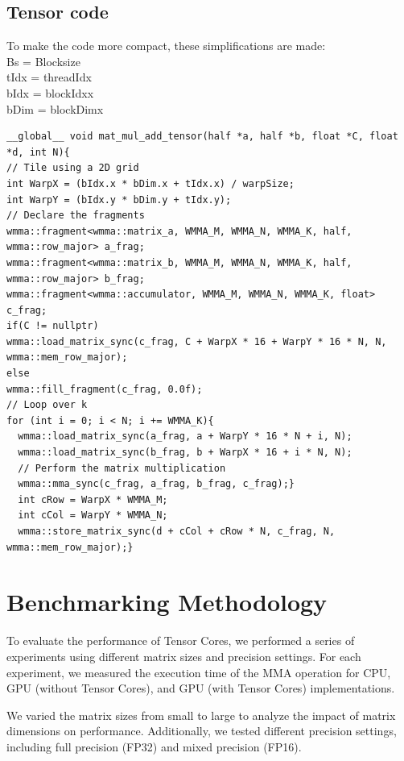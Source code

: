 \documentclass[conference]{IEEEtran}
\begin{document}
  \subsection{Tensor code}\label{sec:TensorCode}
  To make the code more compact, these simplifications are made:\\
  Bs = Blocksize \\
  tIdx = threadIdx \\
  bIdx = blockIdxx \\
  bDim = blockDimx

  \begin{lstlisting}
__global__ void mat_mul_add_tensor(half *a, half *b, float *C, float *d, int N){
// Tile using a 2D grid
int WarpX = (bIdx.x * bDim.x + tIdx.x) / warpSize;
int WarpY = (bIdx.y * bDim.y + tIdx.y);
// Declare the fragments
wmma::fragment<wmma::matrix_a, WMMA_M, WMMA_N, WMMA_K, half, wmma::row_major> a_frag;
wmma::fragment<wmma::matrix_b, WMMA_M, WMMA_N, WMMA_K, half, wmma::row_major> b_frag;
wmma::fragment<wmma::accumulator, WMMA_M, WMMA_N, WMMA_K, float> c_frag;
if(C != nullptr)
wmma::load_matrix_sync(c_frag, C + WarpX * 16 + WarpY * 16 * N, N, wmma::mem_row_major);
else
wmma::fill_fragment(c_frag, 0.0f);
// Loop over k
for (int i = 0; i < N; i += WMMA_K){
  wmma::load_matrix_sync(a_frag, a + WarpY * 16 * N + i, N);
  wmma::load_matrix_sync(b_frag, b + WarpX * 16 + i * N, N);
  // Perform the matrix multiplication
  wmma::mma_sync(c_frag, a_frag, b_frag, c_frag);}
  int cRow = WarpX * WMMA_M;
  int cCol = WarpY * WMMA_N;
  wmma::store_matrix_sync(d + cCol + cRow * N, c_frag, N, wmma::mem_row_major);}
  \end{lstlisting}


  \section{Benchmarking Methodology}\label{sec:benchmarking-methodology}
  
  To evaluate the performance of Tensor Cores, we performed a series of experiments using different 
  matrix sizes and precision settings. For each experiment, we measured the execution time of the 
  MMA operation for CPU, GPU (without Tensor Cores), and GPU (with Tensor Cores) implementations.
  
  We varied the matrix sizes from small to large to analyze the impact of matrix dimensions on 
  performance. Additionally, we tested different precision settings, including full precision (FP32)
  and mixed precision (FP16).
  
\end{document}
